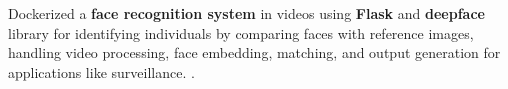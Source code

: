 \item{Dockerized a \textbf{face recognition system} in videos using \textbf{Flask} and \textbf{deepface} library for identifying individuals by comparing faces with reference images, handling video processing, face embedding, matching, and output generation for applications like surveillance. .}